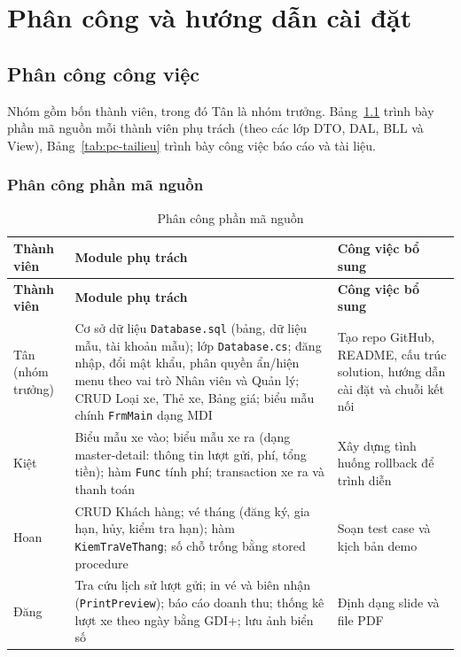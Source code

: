 \chapter{Phân công và hướng dẫn cài đặt}

\section{Phân công công việc}

Nhóm gồm bốn thành viên, trong đó Tân là nhóm trưởng. Bảng~\ref{tab:pc-code} trình bày phần mã nguồn mỗi thành viên phụ trách (theo các lớp DTO, DAL, BLL và View), Bảng~\ref{tab:pc-tailieu} trình bày công việc báo cáo và tài liệu.

\subsection{Phân công phần mã nguồn}

\begin{longtable}{@{}>{\raggedright\arraybackslash}p{2.3cm} >{\raggedright\arraybackslash}p{7.3cm} >{\raggedright\arraybackslash}p{4.6cm}@{}}
  \caption{Phân công phần mã nguồn}\label{tab:pc-code}\\
  \toprule
  \textbf{Thành viên} & \textbf{Module phụ trách} & \textbf{Công việc bổ sung} \\
  \midrule
  \endfirsthead
  \toprule
  \textbf{Thành viên} & \textbf{Module phụ trách} & \textbf{Công việc bổ sung} \\
  \midrule
  \endhead
  \bottomrule
  \endlastfoot
  Tân (nhóm trưởng) & Cơ sở dữ liệu \texttt{Database.sql} (bảng, dữ liệu mẫu, tài khoản mẫu); lớp \texttt{Database.cs}; đăng nhập, đổi mật khẩu, phân quyền ẩn/hiện menu theo vai trò Nhân viên và Quản lý; CRUD Loại xe, Thẻ xe, Bảng giá; biểu mẫu chính \texttt{FrmMain} dạng MDI & Tạo repo GitHub, README, cấu trúc solution, hướng dẫn cài đặt và chuỗi kết nối \\[4pt]
  Kiệt & Biểu mẫu xe vào; biểu mẫu xe ra (dạng master-detail: thông tin lượt gửi, phí, tổng tiền); hàm \texttt{Func} tính phí; transaction xe ra và thanh toán & Xây dựng tình huống rollback để trình diễn \\[4pt]
  Hoan & CRUD Khách hàng; vé tháng (đăng ký, gia hạn, hủy, kiểm tra hạn); hàm \texttt{KiemTraVeThang}; số chỗ trống bằng stored procedure & Soạn test case và kịch bản demo \\[4pt]
  Đăng & Tra cứu lịch sử lượt gửi; in vé và biên nhận (\texttt{PrintPreview}); báo cáo doanh thu; thống kê lượt xe theo ngày bằng GDI+; lưu ảnh biển số & Định dạng slide và file PDF \\
\end{longtable}


